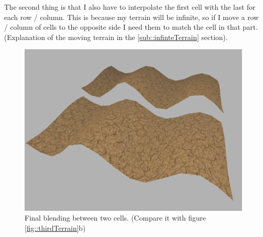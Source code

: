 \newpage

\begin{figure}[hbt!]
	\centering
	\qquad
	\caption{}
\end{figure}

\noindent
The second thing is that I also have to interpolate the first cell with the last for each row / column. This is because my terrain will be infinite, so if I move a row / column of cells to the opposite side I need them to match the cell in that part. (Explanation of the moving terrain in the \ref{sub::infinteTerrain} section).

\begin{figure}[hbt!]
	\centering
	\includegraphics[width= 0.75
	\textwidth]{images/terrain7.png}
	\caption{Final blending between two cells. (Compare it with figure \ref{fig::thirdTerrain}b)}
\end{figure} 

